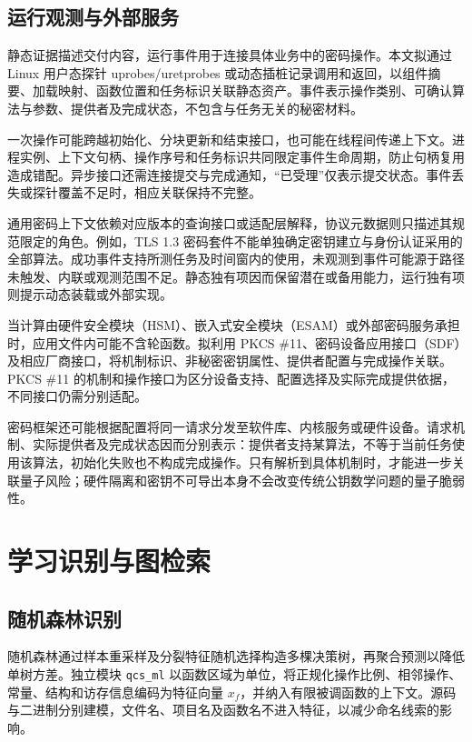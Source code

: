 \subsection{运行观测与外部服务}
\label{subsec:runtime-crypto-principles}
\label{subsec:hardware-provider-principles}

静态证据描述交付内容，运行事件用于连接具体业务中的密码操作。本文拟通过 Linux 用户态探针 uprobes/uretprobes 或动态插桩记录调用和返回\cite{linux-uprobes}，以组件摘要、加载映射、函数位置和任务标识关联静态资产。事件表示操作类别、可确认算法与参数、提供者及完成状态，不包含与任务无关的秘密材料。

一次操作可能跨越初始化、分块更新和结束接口，也可能在线程间传递上下文。进程实例、上下文句柄、操作序号和任务标识共同限定事件生命周期，防止句柄复用造成错配。异步接口还需连接提交与完成通知，“已受理”仅表示提交状态。事件丢失或探针覆盖不足时，相应关联保持不完整。

通用密码上下文依赖对应版本的查询接口或适配层解释，协议元数据则只描述其规范限定的角色。例如，TLS 1.3 密码套件不能单独确定密钥建立与身份认证采用的全部算法\cite{rfc8446}。成功事件支持所测任务及时间窗内的使用，未观测到事件可能源于路径未触发、内联或观测范围不足。静态独有项因而保留潜在或备用能力，运行独有项则提示动态装载或外部实现。

当计算由硬件安全模块（HSM）、嵌入式安全模块（ESAM）或外部密码服务承担时，应用文件内可能不含轮函数。拟利用 PKCS \#11、密码设备应用接口（SDF）及相应厂商接口，将机制标识、非秘密密钥属性、提供者配置与完成操作关联。PKCS \#11 的机制和操作接口为区分设备支持、配置选择及实际完成提供依据\cite{pkcs11-v31}，不同接口仍需分别适配。

密码框架还可能根据配置将同一请求分发至软件库、内核服务或硬件设备。请求机制、实际提供者及完成状态因而分别表示：提供者支持某算法，不等于当前任务使用该算法，初始化失败也不构成完成操作。只有解析到具体机制时，才能进一步关联量子风险；硬件隔离和密钥不可导出本身不会改变传统公钥数学问题的量子脆弱性。

\section{学习识别与图检索}
\label{sec:intelligent-extension-principles}

\subsection{随机森林识别}
\label{subsec:rf-principles}

随机森林通过样本重采样及分裂特征随机选择构造多棵决策树，再聚合预测以降低单树方差\cite{breiman2001rf}。独立模块 \texttt{qcs\_ml} 以函数区域为单位，将正规化操作比例、相邻操作、常量、结构和访存信息编码为特征向量 $x_f$，并纳入有限被调函数的上下文。源码与二进制分别建模，文件名、项目名及函数名不进入特征，以减少命名线索的影响。


